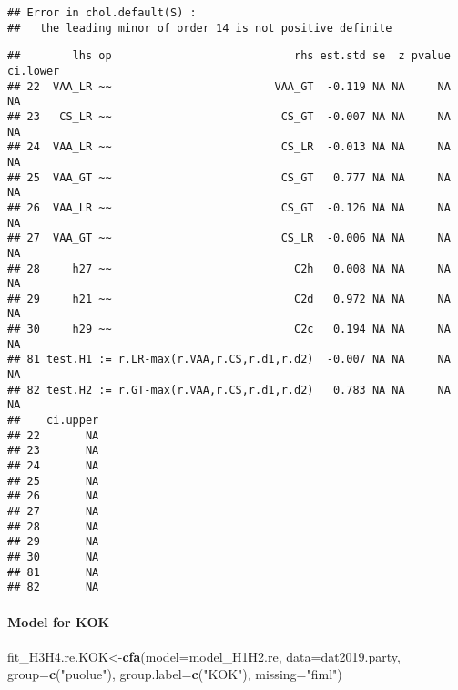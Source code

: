 \documentclass[
]{article}
\newenvironment{Shaded}{\begin{snugshade}}{\end{snugshade}}
\newcommand{\DataTypeTok}[1]{\textcolor[rgb]{0.13,0.29,0.53}{#1}}
\newcommand{\KeywordTok}[1]{\textcolor[rgb]{0.13,0.29,0.53}{\textbf{#1}}}
\newcommand{\NormalTok}[1]{#1}
\newcommand{\OperatorTok}[1]{\textcolor[rgb]{0.81,0.36,0.00}{\textbf{#1}}}
\newcommand{\StringTok}[1]{\textcolor[rgb]{0.31,0.60,0.02}{#1}}
\begin{document}
\begin{verbatim}
## Error in chol.default(S) : 
##   the leading minor of order 14 is not positive definite
\end{verbatim}

\begin{Shaded}
\end{Shaded}

\begin{verbatim}
##        lhs op                            rhs est.std se  z pvalue ci.lower
## 22  VAA_LR ~~                         VAA_GT  -0.119 NA NA     NA       NA
## 23   CS_LR ~~                          CS_GT  -0.007 NA NA     NA       NA
## 24  VAA_LR ~~                          CS_LR  -0.013 NA NA     NA       NA
## 25  VAA_GT ~~                          CS_GT   0.777 NA NA     NA       NA
## 26  VAA_LR ~~                          CS_GT  -0.126 NA NA     NA       NA
## 27  VAA_GT ~~                          CS_LR  -0.006 NA NA     NA       NA
## 28     h27 ~~                            C2h   0.008 NA NA     NA       NA
## 29     h21 ~~                            C2d   0.972 NA NA     NA       NA
## 30     h29 ~~                            C2c   0.194 NA NA     NA       NA
## 81 test.H1 := r.LR-max(r.VAA,r.CS,r.d1,r.d2)  -0.007 NA NA     NA       NA
## 82 test.H2 := r.GT-max(r.VAA,r.CS,r.d1,r.d2)   0.783 NA NA     NA       NA
##    ci.upper
## 22       NA
## 23       NA
## 24       NA
## 25       NA
## 26       NA
## 27       NA
## 28       NA
## 29       NA
## 30       NA
## 81       NA
## 82       NA
\end{verbatim}

\newpage

\hypertarget{model-for-kok}{%
\paragraph{Model for KOK}\label{model-for-kok}}

\begin{Shaded}
\begin{Highlighting}[]
\NormalTok{fit_H3H4.re.KOK<-}\KeywordTok{cfa}\NormalTok{(}\DataTypeTok{model=}\NormalTok{model_H1H2.re,}
                    \DataTypeTok{data=}\NormalTok{dat2019.party,}
                    \DataTypeTok{group=}\KeywordTok{c}\NormalTok{(}\StringTok{"puolue"}\NormalTok{),}
                    \DataTypeTok{group.label=}\KeywordTok{c}\NormalTok{(}\StringTok{"KOK"}\NormalTok{),}
                    \DataTypeTok{missing=}\StringTok{"fiml"}\NormalTok{)}
\end{Highlighting}
\end{Shaded}
\end{document}
